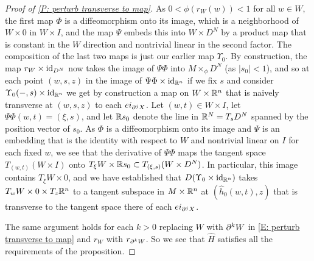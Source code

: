\begin{proof}[Proof of \cref{P: perturb transverse to map}]
	As $0 < \phi(r_W(w)) < 1$ for all $w \in W$, the first map $\Phi$ is a diffeomorphism onto its image, which is a neighborhood of $W \times 0$ in $W \times I$, and the map $\Psi$ embeds this into $W \times D^N$ by a product map that is constant in the $W$ direction and nontrivial linear in the second factor.
	The composition of the last two maps is just our earlier map $\Upsilon_0$.
	By construction, the map $r_W \times \mathrm{id}_{D^N}$ now takes the image of $\Psi\Phi$ into $M\times_\phi D^N$ (as $|s_0|<1$), and so at each point $(w,s,z)$ in the image of $\Psi\Phi \times \mathrm{id}_{\mathbb{R}^n}$ if we fix $s$ and consider $\Upsilon_0(-,s) \times \mathrm{id}_{\mathbb{R}^n}$ we get by construction a map on $W \times \mathbb{R}^n$ that is naively transverse at $(w,s,z)$ to each $ei_{\partial^j X}$.
	Let $(w,t) \in W \times I$, let $\Psi \Phi(w,t) = (\xi,s)$, and let $\mathbb{R} s_0$ denote the line in $\mathbb{R}^N = T_sD^N$ spanned by the position vector of $s_0$.
	As $\Phi$ is a diffeomorphism onto its image and $\Psi$ is an embedding that is the identity with respect to $W$ and nontrivial linear on $I$ for each fixed $w$, we see
	that the derivative of $\Psi\Phi$ maps the tangent space $T_{(w,t)}(W \times I)$ onto $T_\xi W \times \mathbb{R} s_0 \subset T_{(\xi,s)}(W \times D^N)$.
	In particular, this image contains $T_\xi W \times 0$, and we have established that $D(\Upsilon_0 \times \mathrm{id}_{\mathbb{R}^n})$ takes $T_w W \times 0 \times T_z\mathbb{R}^n$ to a tangent subspace in $M \times \mathbb{R}^n$ at $(\hat h_0(w,t),z)$ that is transverse to the tangent space there of each $ei_{\partial^j X}$.

	The same argument holds for each $k>0$ replacing $W$ with $\partial^{k}W$ in \eqref{E: perturb transverse to map} and $r_W$ with $r_{\partial^k W}$.
	So we see that $\hat H$ satisfies all the requirements of the proposition.
	\qedhere

\end{proof}

